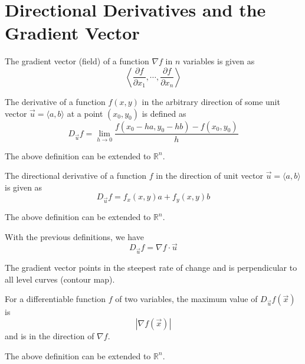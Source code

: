 \section{Directional Derivatives and the Gradient Vector}
\begin{definition}
    The gradient vector (field) of a function \(\nabla f\) in \(n\) variables is given as 
    \[
        \left\langle \frac{\partial f}{\partial x_1},\cdots,\frac{\partial f}{\partial x_n}   \right\rangle 
    \]
\end{definition}
\begin{definition}
    The derivative of a function \(f(x,y)\) in the arbitrary direction of some unit vector \(\vec{u}=\langle a,b \rangle  \) at a point \((x_0,y_0)\) is defined as 
    \[
        D_{\vec{u} }f = \lim_{h\to 0}\frac{f(x_0 -ha,y_0 -hb)-f(x_0,y_0)}{h}
    \]
\end{definition}
\begin{remark}
    The above definition can be extended to \(\mathbb{R} ^n\).
\end{remark}
\begin{theorem}
    The directional derivative of a function \(f\) in the direction of unit vector \(\vec{u} =\langle a,b \rangle \) is given as
    \[
        D _{\vec{u}} f=f_x(x,y)a+f_y(x,y)b
    \]
\end{theorem}
\begin{remark}
    The above definition can be extended to \(\mathbb{R} ^n\).
\end{remark}
\begin{proposition}
    With the previous definitions, we have
    \[
        D _{\vec{u}} f=\nabla f\cdot \vec{u} 
    \]
\end{proposition}
\begin{remark}
    The gradient vector points in the steepest rate of change and is perpendicular to all level curves (contour map).
\end{remark}
\begin{theorem}
    For a differentiable function \(f\) of two variables, the maximum value of \(D_{\vec{u} }f \left( \vec{x}  \right) \) is
    \[
        \left\vert \nabla f \left( \vec{x}  \right)  \right\vert 
    \]
    and is in the direction of \(\nabla f\).
\end{theorem}
\begin{remark}
    The above definition can be extended to \(\mathbb{R} ^n\).
\end{remark}
